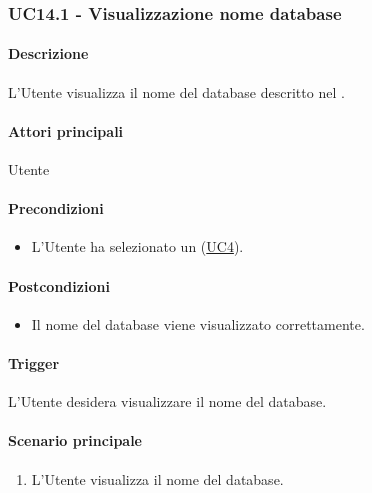 
\subsubsection{UC14.1 - Visualizzazione nome database}\label{UC14point1}
\paragraph*{Descrizione}
L'Utente visualizza il nome del database descritto nel .

\paragraph*{Attori principali}
Utente

\paragraph*{Precondizioni}
\begin{itemize}
  \item L'Utente ha selezionato un  (\hyperref[UC4]{UC4}).
\end{itemize}

\paragraph*{Postcondizioni}
\begin{itemize}
  \item Il nome del database viene visualizzato correttamente.
\end{itemize}

\paragraph*{Trigger}
L'Utente desidera visualizzare il nome del database.

\paragraph*{Scenario principale}
\begin{enumerate}
  \item L'Utente visualizza il nome del database.
\end{enumerate}


